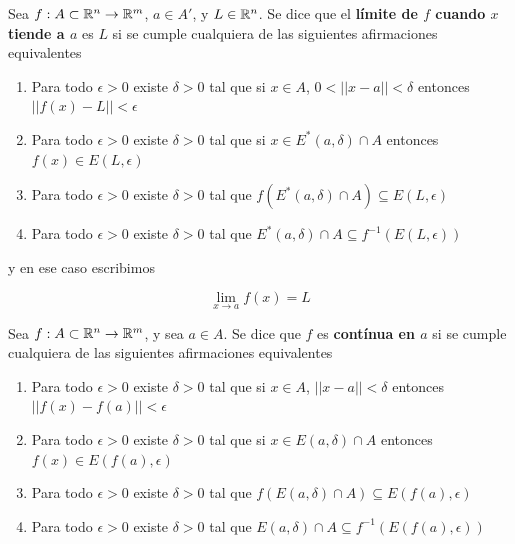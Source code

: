 \begin{definition}[Límite]
Sea $f : A \subset \mathbb{R}^n \to \mathbb{R}^m$, $ a \in A'$, y $L \in \mathbb{R}^n$.  Se dice que el \textbf{límite de $f$ cuando $x$ tiende a $a$}  es $L$ si se cumple cualquiera de las siguientes afirmaciones equivalentes

\begin{enumerate} 

\item Para todo $\epsilon > 0$ existe $\delta > 0$ tal que si $x \in A$, $0 < ||x-a|| < \delta$ entonces $||f(x) - L|| < \epsilon$

\item Para todo $\epsilon > 0$ existe $\delta > 0$ tal que si $x \in E^*(a,\delta) \cap A$ entonces $f(x) \in E(L,\epsilon)$

\item Para todo $\epsilon > 0$ existe $\delta > 0$ tal que $f(E^*(a,\delta) \cap A) \subseteq E(L,\epsilon)$

\item Para todo $\epsilon > 0$ existe $\delta > 0$ tal que $E^*(a,\delta) \cap A \subseteq f^{-1}(E(L,\epsilon))$

\end{enumerate}

y en ese caso escribimos

$$ \displaystyle \lim_{x \to a} f(x) = L $$
\end{definition}

\begin{definition}[Continuidad]
Sea $ f: A \subset \mathbb{R}^n \to \mathbb{R}^m$, y sea $a \in A$.  Se dice que $f$ es \textbf{contínua en $a$}  si se cumple cualquiera de las siguientes afirmaciones equivalentes

\begin{enumerate} 
\item Para todo $\epsilon > 0$ existe $\delta > 0$ tal que si $x \in A$, $||x-a|| < \delta$ entonces $||f(x) - f(a)|| < \epsilon$

\item Para todo $\epsilon > 0$ existe $\delta > 0$ tal que si $x \in E(a,\delta) \cap A$ entonces $f(x) \in E(f(a),\epsilon)$

\item Para todo $\epsilon > 0$ existe $\delta > 0$ tal que $f(E(a,\delta) \cap A) \subseteq E(f(a),\epsilon)$

\item Para todo $\epsilon > 0$ existe $\delta > 0$ tal que $E(a,\delta) \cap A \subseteq f^{-1}(E(f(a),\epsilon))$
\end{enumerate}
\end{definition}

